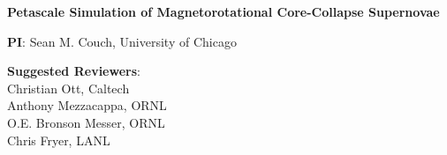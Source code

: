 \documentclass[12pt,letterpaper,english]{article}
\newcommand{\doctitle}{Petascale Simulation of Magnetorotational Core-Collapse Supernovae}
\begin{document}
\setlength{\parindent}{0in}


\pagestyle{fancy} 
\renewcommand{\headrulewidth}{0.0pt}

\begin{center} \textbf{\doctitle{}} \\
\end{center}

\textbf{PI}:
Sean M. Couch, University of Chicago \\
\medskip

\textbf{Suggested Reviewers}:\\
Christian Ott, Caltech \\
Anthony Mezzacappa, ORNL \\
O.E. Bronson Messer, ORNL \\
Chris Fryer, LANL \\
\end{document}
